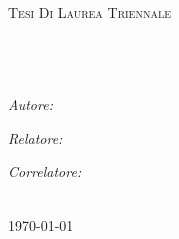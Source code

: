 \documentclass[11pt, oneside]{Thesis} %
\begin{document}
\begin{titlepage}
\begin{center}

\textsc{\LARGE \univname}\\ %
\smallskip
{\large \facname}\\
\smallskip
\deptname\\[1.5cm]

\textsc{\Large Tesi Di Laurea Triennale}\\[0.5cm] %

\HRule \\[0.4cm] %
{\huge \bfseries \ttitle}\\[0.4cm] %
\HRule \\[1.5cm] %
 
\begin{minipage}{0.4\textwidth}

\begin{flushleft} \large
\emph{Autore:}\\
\authornames             %
\end{flushleft}
\end{minipage}
\begin{minipage}{0.4\textwidth}
\begin{flushright} \large
\emph{Relatore:} \\
\supname		 %

\emph{Correlatore:} \\
\cosupname		 %
\end{flushright}
\end{minipage}\\[3cm]
 
 
{\large \today}\\[4cm] %
 
\vfill
\end{center}

\end{titlepage}
  
\end{document}
